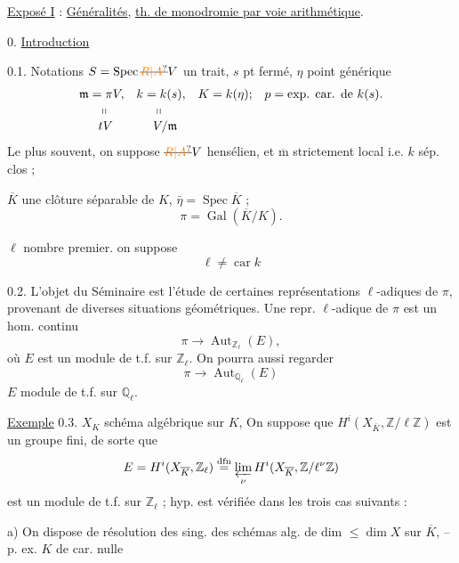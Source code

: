 \uline{Exposé I}\quad {} : \uline{Généralités},  \uline{th. de monodromie par voie arithmétique}.

0. \uline{Introduction}

0.1. Notations \(S=\operatorname{Spec}\deleted{\unsure{R|A}}V\) un trait, \(s\) pt fermé, \(\eta\) point générique
\[
\begin{aligned}
\mathfrak m&=\pi V, & k&=k(s), & K&=k(\eta); & p&=\text{exp. car. de }k(s).\\[-2pt]
&\phantom{=}\shortparallel &&\phantom{=}\shortparallel\\[-2pt]
&\phantom{=}tV &&\phantom{=}V/\mathfrak m
\end{aligned}
\]
Le plus souvent, on suppose \(\deleted{\unsure{R|A}}V\) hensélien, et \(\overline{\mathrm m}\) strictement local i.e. \(k\) sép. clos ;

 \(\overline K\) une clôture séparable de \(K\), \(\bar\eta=\operatorname{Spec}\overline K\) ;
\[
\pi=\operatorname{Gal}(\overline K/K).
\]

\(\ell\) nombre premier.     on suppose 
\[
\ell\ne\operatorname{car}k
\]

0.2. L'objet du Séminaire est l'étude de certaines représentations \(\ell\)-adiques de \(\pi\), provenant de diverses situations géométriques. Une repr. \(\ell\)-adique de \(\pi\) est un  hom. continu
\[
\pi\longrightarrow\operatorname{Aut}_{\mathbb Z_\ell}(E),\tag*{(*)}
\]
où \(E\) est un module de t.f. sur \(\mathbb Z_\ell\). On pourra aussi regarder
\[
\pi\longrightarrow\operatorname{Aut}_{\mathbb Q_\ell}(E)
\]
\(E\) module de t.f. sur \(\mathbb Q_\ell\).

\uline{Exemple} 0.3. \(X_K\) schéma algébrique sur \(K\),  On suppose que \(H^i(X_{\overline K},\mathbb Z/\ell\mathbb Z)\) est un groupe fini, de sorte que
\[
E=H^i(X_{\overline K},\mathbb Z_\ell)\overset{\mathrm{dfn}}{=}\varprojlim_{\nu}H^i(X_{\overline K},\mathbb Z/\ell^{\nu}\mathbb Z)
\]
est un module de t.f. sur \(\mathbb Z_\ell\) ;  hyp.  est  vérifiée dans les trois cas suivants :

a) On dispose de résolution des sing.  des schémas alg. de dim \(\leq\dim X\) sur \(\overline K\), -- p. ex. \(K\) de car. nulle

